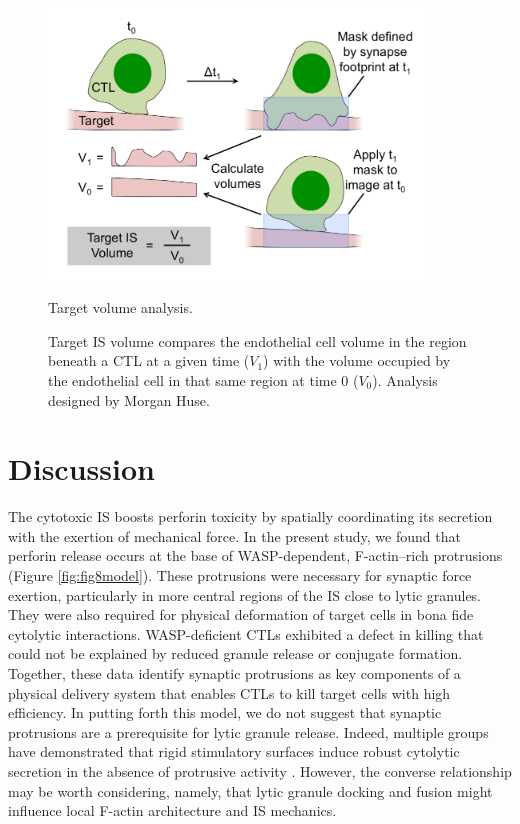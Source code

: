 \begin{figure}[htbp]
	\centering
	\includegraphics[width=0.9\textwidth]{../figures/chapter2/fig7supp2.png}
	\caption{Target volume analysis.}
	\caption*{Target IS volume compares the endothelial cell volume in the region beneath a CTL at a given time ($V_1$) with the volume occupied by the endothelial cell in that same region at time 0 ($V_0$). Analysis designed by Morgan Huse.}
	\label{fig:fig7supp2}
\end{figure}


\section{Discussion}
The cytotoxic IS boosts perforin toxicity by spatially coordinating its secretion with the exertion of mechanical force. In the present study, we found that perforin release occurs at the base of WASP-dependent, F-actin–rich protrusions (Figure \ref{fig:fig8model}). These protrusions were necessary for synaptic force exertion, particularly in more central regions of the IS close to lytic granules. They were also required for physical deformation of target cells in bona fide cytolytic interactions. WASP-deficient CTLs exhibited a defect in killing that could not be explained by reduced granule release or conjugate formation. Together, these data identify synaptic protrusions as key components of a physical delivery system that enables CTLs to kill target cells with high efficiency. In putting forth this model, we do not suggest that synaptic protrusions are a prerequisite for lytic granule release. Indeed, multiple groups have demonstrated that rigid stimulatory surfaces induce robust cytolytic secretion in the absence of protrusive activity \cite{Beal2009, Rak2011, Ritter2017, Qu2011, Brown2011}. However, the converse relationship may be worth considering, namely, that lytic granule docking and fusion might influence local F-actin architecture and IS mechanics.

